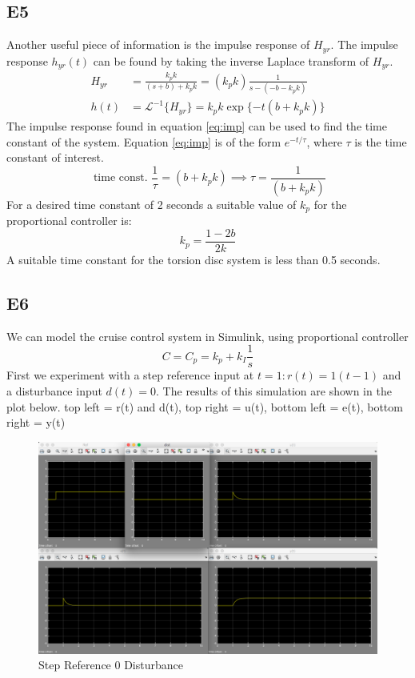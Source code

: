 \documentclass[10pt,titlepage]{article}
\begin{document}
	\subsection*{E5}
		Another useful piece of information is the impulse response of $H_{yr}$. The impulse response $h_{yr}(t)$ can be found by taking the inverse Laplace transform of $H_{yr}$.
		\begin{align}
			H_{yr}&=\frac{k_pk}{(s+b)+k_pk}=(k_pk)\frac{1}{s-(-b-k_pk)} \\
			h(t)&=\mathcal{L}^{-1}\{H_{yr}\} = k_pk\exp\{{-t(b+k_pk)}\} \label{eq:imp}
		\end{align} 		
		The impulse response found in equation \ref{eq:imp} can be used to find the time constant of the system. Equation \ref{eq:imp} is of the form $e^{-t/\tau}$, where $\tau$ is the time constant of interest. 
		\begin{equation} \label{eq:tconst}
			\mbox{ time const. }\frac{1}{\tau}=(b+k_pk)\implies \tau=\frac{1}{(b+k_pk)}
		\end{equation}
		For a desired time constant of 2 seconds a suitable value of $k_p$ for the proportional controller is:
		\begin{equation} \label{eq:2stau}
			k_p=\frac{1-2b}{2k}
		\end{equation}
		A suitable time constant for the torsion disc system is less than 0.5 seconds.

	\subsection*{E6}
		We can model the cruise control system in Simulink, using proportional controller $$C=C_p=k_p+k_I\frac{1}{s}$$ First we experiment with a step reference input at $t=1: r(t)=1(t-1)$ and a disturbance input $d(t)=0$. The results of this simulation are shown in the plot below. top left = r(t) and d(t), top right = u(t), bottom left = e(t), bottom right = y(t)
		\begin{figure}[H]
			\centering
			\includegraphics[scale=0.3]{e6-1}
			\caption{Step Reference 0 Disturbance}
		\end{figure}
		
\end{document}
